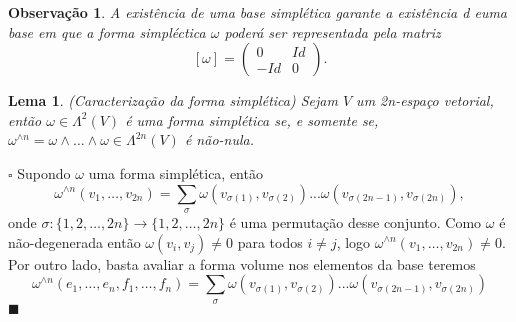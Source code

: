 \documentclass[12pt]{book}
\newtheorem{lema}[teorema]{Lema}
\newtheorem{observacao}[teorema]{Observação}
\newenvironment{prova}[1]{$\square$ #1}{\hfill$\blacksquare$}
\newcommand{\vermelho}[1]{{\color{red}#1}}
\begin{document}
	\begin{observacao}\label{observacao_existencia_base_simpletica}
		A existência de uma base simplética garante a existência d euma base em que a forma simpléctica $\omega$ poderá ser representada pela matriz
		$$
		[\omega]=\left(
		\begin{array}{cc}
		0 & Id
		\\
		-Id & 0
		\end{array}
		\right).
		$$
	\end{observacao}
	
	
	\begin{lema}
		(Caracterização da forma simplética) Sejam $V$ um 2n-espaço vetorial, então $\omega \in \Lambda^{2}(V)$ é uma forma simplética se, e somente se, $\omega^{\wedge n} = \omega\wedge \dots \wedge \omega \in \Lambda^{2n}(V)$ é não-nula.
	\end{lema}
	\begin{prova}
		\vermelho{Supondo $\omega$ uma forma simplética, então 
			$$
			\omega^{\wedge n}(v_{1}, \dots, v_{2n}) =\sum_{\sigma} \omega(v_{\sigma(1)}, v_{\sigma(2)})...\omega(v_{\sigma(2n-1)}, v_{\sigma(2n)}),
			$$
			onde $\sigma:\{1, 2, \dots , 2n\} \to \{1, 2, \dots , 2n\}$ é uma permutação desse conjunto. Como $\omega$ é não-degenerada então $\omega(v_{i}, v_{j}) \neq 0 $ para todos $i \neq j$, logo $\omega^{\wedge n}(v_{1}, \dots, v_{2n}) \neq 0$. Por outro lado, basta avaliar a forma volume nos elementos da base teremos 
			$$
			\omega^{\wedge n}(e_{1}, \dots, e_{n}, f_{1},\dots, f_{n}) = \sum_{\sigma} \omega(v_{\sigma(1)}, v_{\sigma(2)})...\omega(v_{\sigma(2n-1)}, v_{\sigma(2n)})
			$$}
	\end{prova}
	
\end{document}
